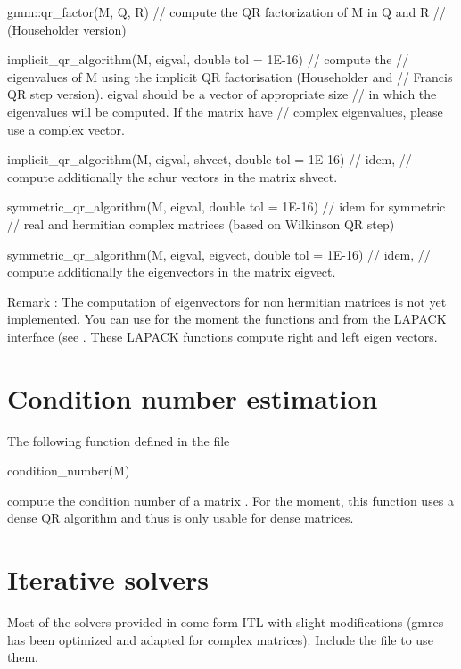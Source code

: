 \documentclass[11pt,a4paper]{article}
\begin{document}
\begin{cppcode}
  gmm::qr_factor(M, Q, R) // compute the QR factorization of M in Q and R
                          // (Householder version)

  implicit_qr_algorithm(M, eigval, double tol = 1E-16) // compute the
     // eigenvalues of M using the implicit QR factorisation (Householder and
     // Francis QR step version). eigval should be a vector of appropriate size
     // in which the eigenvalues will be computed. If the matrix have 
     // complex eigenvalues, please use a complex vector.

  implicit_qr_algorithm(M, eigval, shvect, double tol = 1E-16) // idem, 
     // compute additionally the schur vectors in the matrix shvect.

  symmetric_qr_algorithm(M, eigval, double tol = 1E-16) // idem for symmetric
     // real and hermitian complex matrices (based on Wilkinson QR step)

  symmetric_qr_algorithm(M, eigval, eigvect, double tol = 1E-16) // idem,
     // compute additionally the eigenvectors in the matrix eigvect.

\end{cppcode}

Remark : The computation of eigenvectors for non hermitian matrices is not yet implemented. You can use for the moment the functions  and  from the LAPACK interface (see . These LAPACK functions compute right and left eigen vectors. 
                   
\section{Condition number estimation}
The following function defined in the file 
\begin{cppcode}
   condition_number(M)
\end{cppcode}
compute the condition number of a matrix . For the moment, this function uses a dense QR algorithm and thus is only usable for dense matrices.

\section{Iterative solvers}
Most of the solvers provided in \gmm come form ITL with slight modifications (gmres has been optimized and adapted for complex matrices). Include the file  to use them.
\end{document}
